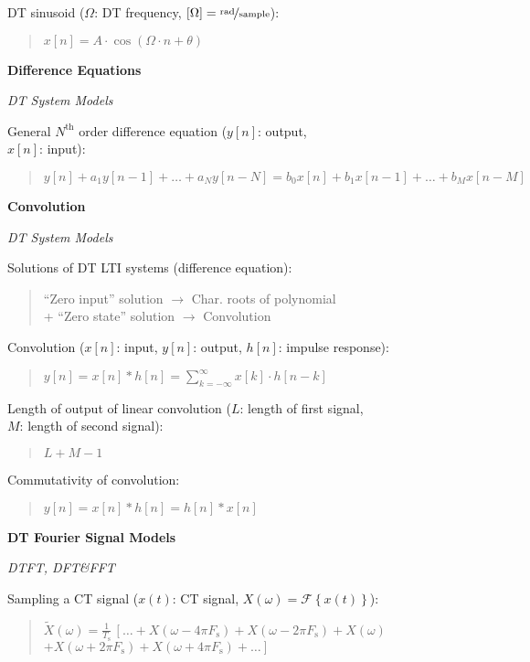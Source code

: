 \documentclass[fontsize=9pt,a4paper,twocolumn]{scrartcl}
\begin{document}
DT sinusoid ($\Omega$: DT frequency, $[\Omega]=\nicefrac{\mathrm{rad}}{\mathrm{sample}}$):
\begin{quote}
	$x[n]=A\cdot\cos(\Omega\cdot n+\theta)$
\end{quote}

\large{\textbf{Difference Equations}}

\textit{DT System Models}

General $N^\mathrm{th}$ order difference equation ($y[n]$: output, \\$x[n]$: input):
\begin{quote}
	$y[n]+a_1 y[n-1]+\dots+a_N y[n-N]=b_0 x[n]+b_1 x[n-1]+\dots+b_M x[n-M]$
\end{quote}

\large{\textbf{Convolution}}

\textit{DT System Models}

Solutions of DT LTI systems (difference equation):
\begin{quote}
	``Zero input'' solution $\to$ Char. roots of polynomial\\
	+ ``Zero state'' solution $\to$ Convolution
\end{quote}

Convolution ($x[n]$: input, $y[n]$: output, $h[n]$: impulse response):
\begin{quote}
	$y[n] = x[n]*h[n] = \sum_{k=-\infty}^\infty x[k]\cdot h[n-k]$
\end{quote}

Length of output of linear convolution ($L$: length of first signal,\\ $M$: length of second signal):
\begin{quote}
	$L+M-1$
\end{quote}

Commutativity of convolution:
\begin{quote}
	$y[n] = x[n]*h[n] = h[n]*x[n]$
\end{quote}

\large{\textbf{DT Fourier Signal Models}}

\textit{DTFT, DFT\&FFT}

Sampling a CT signal ($x(t)$: CT signal, $X(\omega)=\mathcal{F}\left\{x(t)\right\}$):
\begin{quote}
	$\widetilde{X}(\omega) = \frac{1}{T_\mathrm{s}}\,\left[\dots+ X(\omega-4\pi F_\mathrm{s})+X(\omega-2\pi F_\mathrm{s})+X(\omega)\right.$\\$\left.+X(\omega+2\pi F_\mathrm{s})+X(\omega+4\pi F_\mathrm{s})+\dots\right]$
\end{quote}
\end{document}
